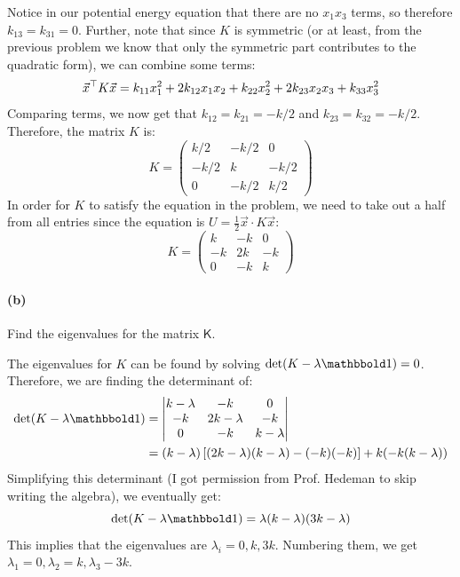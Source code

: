 \documentclass{article}
\newcommand{\I}{\mathbbold 1}
\begin{document}
\begin{solution}
	Notice in our potential energy equation that there are no $x_1x_3$ terms, so therefore $k_{13} = k_{31} = 0$.
	Further, note that since $K$ is symmetric (or at least, from the previous problem we know that only the 
	symmetric part contributes to the quadratic form), we can combine some terms:
	\[
	\vec x^\top K\vec x = k_{11}x_1^2 + 2k_{12}x_1x_2 + k_{22}x_2^2 + 2k_{23}x_2x_3 + k_{33}x_3^2
	\] 
	Comparing terms, we now get that $k_{12} = k_{21} = - k / 2$ and $k_{23} = k_{32} = -k / 2$. Therefore, 
	the matrix $K$ is:
	\[
		K = \begin{pmatrix} k / 2 & - k / 2 & 0 \\ - k / 2 & k & -k / 2\\ 0 & - k / 2 &k/2\end{pmatrix} 
	\] 
	In order for $K$ to satisfy the equation in the problem, we need to take out a half from all entries since
	the equation is $U = \frac{1}{2}\vec x \cdot K \vec x$:
	\[
		K = \begin{pmatrix} k & -k & 0\\ -k & 2k & -k\\ 0 & -k & k \end{pmatrix} 
	\] 
\end{solution}

\paragraph{(b)}
Find the eigenvalues for the matrix $\mathsf{K}$.

\begin{solution}
	The eigenvalues for $K$ can be found by solving $\det(K - \lambda \mathbbold 1) = 0$. Therefore, we 
	are finding the determinant of:
		\begin{align*}
			\det(K - \lambda \I) &= \begin{vmatrix} k - \lambda & -k & 0 \\ -k & 2k - \lambda & - k\\ 0 & -k & k - \lambda\end{vmatrix}\\
				&= (k - \lambda) \left[ (2k - \lambda)(k - \lambda) - (-k)(-k)\right] + k(-k(k - \lambda))
		\end{align*} 
	Simplifying this determinant (I got permission from Prof. Hedeman to skip writing the algebra), we eventually
	get:
	\[
		\det(K - \lambda \I) = \lambda(k - \lambda)(3k - \lambda)	
	\] 
	This implies that the eigenvalues are $\lambda_i = 0, k, 3k$. Numbering them, we get $\lambda_1 = 0, 
	\lambda_2 = k, \lambda_3 - 3k$. 
\end{solution}
\end{document}
